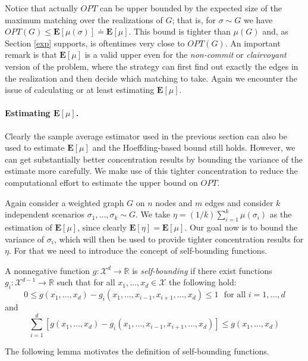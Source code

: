 \documentclass[12pt]{article}
\newcommand{\E}[1]{\mathbf{E}\left[#1\right]}
\begin{document}
		Notice that actually $OPT$ can be upper bounded by the expected size of the maximum matching over the realizations of $G$; that is, for $\sigma \sim G$ we have $OPT(G) \le \E{\mu(\sigma)} \doteq \E{\mu}$. This bound is tighter than $\mu(G)$ and, as Section \ref{exp} supports, is oftentimes very close to $OPT(G)$. An important remark is that $\E{\mu}$ is a valid upper even for the \emph{non-commit} or \emph{clairvoyant} version of the problem, where the strategy can first find out exactly the edges in the realization and then decide which matching to take. Again we encounter the issue of calculating or at least estimating $\E{\mu}$. 
		
		\paragraph{Estimating $\E{\mu}$.} Clearly the sample average estimator used in the previous section can also be used to estimate $\E{\mu}$ and the Hoeffding-based bound still holds. However, we can get substantially better concentration results by bounding the variance of the estimate more carefully. We make use of this tighter concentration to reduce the computational effort to estimate the upper bound on $OPT$.
		
		Again consider a weighted graph $G$ on $n$ nodes and $m$ edges and consider $k$ independent scenarios $\sigma_1, \ldots, \sigma_k \sim G$. We take $\eta = (1/k) \sum_{i = 1}^k \mu(\sigma_i)$ as the estimation of $\E{\mu}$, since clearly $\E{\eta} = \E{\mu}$. Our goal now is to bound the variance of $\sigma_i$, which will then be used to provide tighter concentration results for $\eta$. For that we need to introduce the concept of self-bounding functions. 
		
		A nonnegative function $g: \mathcal{X}^d \rightarrow \mathbb{R}$ is \emph{self-bounding} if there exist functions $g_i : \mathcal{X}^{d - 1} \rightarrow \mathbb{R}$ such that for all $x_1, \ldots, x_d \in \mathcal{X}$ the following hold:
\begin{equation*}
			0 \le g(x_1, \ldots, x_d) - g_i(x_1, \ldots, x_{i-1}, x_{i+1}, \ldots, x_d) \le 1 \ \ \ \textrm{for all } i = 1, \ldots, d
		\end{equation*}
		and
\begin{equation*}
			\sum_{i = 1}^d \left[g(x_1, \ldots, x_d) - g_i(x_1, \ldots, x_{i-1}, x_{i+1}, \ldots, x_d) \right] \le g(x_1, \ldots, x_d)
		\end{equation*}

		The following lemma motivates the definition of self-bounding functions.
		
\end{document}
